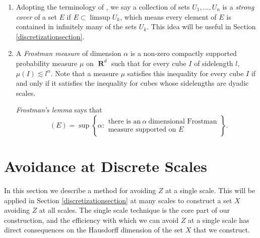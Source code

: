 \documentclass[dvipsnames,letterpaper,12pt]{article}
\numberwithin{equation}{section}
\theoremstyle{plain}
\DeclareMathOperator{\hausdim}{\dim_{\mathbf{H}}}
\DeclareMathOperator{\RR}{\mathbf{R}}
\begin{document}
\begin{enumerate}

	\item\label{strongCoverDefn} Adopting the terminology of \cite{KatzTao}, we say a collection of sets $U_1, \dots, U_n$ is a {\it strong cover} of a set $E$ if $E \subset \limsup U_k$, which means every element of $E$ is contained in infinitely many of the sets $U_k$. This idea will be useful in Section \ref{discretizationsection}.  


	\item\label{frostmanItem} A {\it Frostman measure} of dimension $\alpha$ is a non-zero compactly supported probability measure $\mu$ on $\RR^d$ such that for every cube $I$ of sidelength $l$, $\mu(I) \lesssim l^\alpha$.
	Note that a measure $\mu$ satisfies this inequality for every cube $I$ if and only if it satisfies the inequality for cubes whose sidelengths are dyadic scales.  

	 {\it Frostman's lemma} says that
	\[ \hausdim(E) = \sup \left\{ \alpha: \begin{array}{c} \text{there is an}\ \alpha\ \text{dimensional Frostman}\\
	\text{measure supported on $E$} \end{array} \right\}. \]
\end{enumerate}









\section{Avoidance at Discrete Scales}\label{discretesection}


In this section we describe a method for avoiding $Z$ at a single scale. This will be applied in Section \ref{discretizationsection} at many scales to construct a set $X$ avoiding $Z$ at all scales. The single scale technique is the core part of our construction, and the efficiency with which we can avoid $Z$ at a single scale has direct consequences on the Hausdorff dimension of the set $X$ that we construct.
\end{document}
